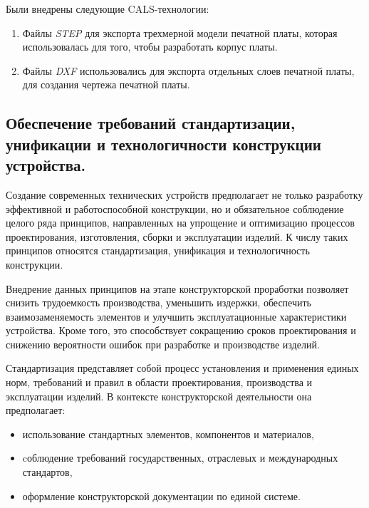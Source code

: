 Были внедрены следующие CALS-технологии:
\begin{enumerate}
\item Файлы \textit{STEP} для экспорта трехмерной модели печатной
платы, которая использовалась для того, чтобы разработать корпус
платы.

\item Файлы \textit{DXF} использовались для экспорта отдельных слоев
печатной платы, для создания чертежа печатной платы.
\end{enumerate}


\subsection{Обеспечение требований стандартизации, 
  унификации и технологичности конструкции устройства.}


Создание современных технических устройств предполагает не только
разработку эффективной и работоспособной конструкции, но и
обязательное соблюдение целого ряда принципов, направленных на
упрощение и оптимизацию процессов проектирования, изготовления, сборки
и эксплуатации изделий. К числу таких принципов относятся
стандартизация, унификация и технологичность конструкции.

Внедрение данных принципов на этапе конструкторской проработки
позволяет снизить трудоемкость производства, уменьшить издержки,
обеспечить взаимозаменяемость элементов и улучшить эксплуатационные
характеристики устройства. Кроме того, это способствует сокращению
сроков проектирования и снижению вероятности ошибок при разработке и
производстве изделий.

Стандартизация представляет собой процесс установления и применения
единых норм, требований и правил в области проектирования,
производства и эксплуатации изделий. В контексте конструкторской
деятельности она предполагает:

\begin{itemize}
\item использование стандартных элементов, компонентов и материалов,
\item cоблюдение требований государственных,
  отраслевых и международных стандартов,
\item  оформление конструкторской документации по единой системе.
\end{itemize}

